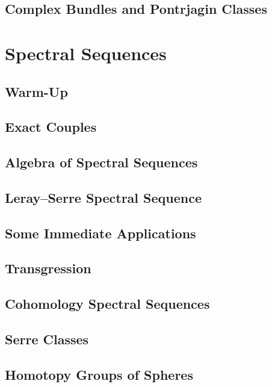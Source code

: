 \documentclass[11pt, a4paper]{article}
\begin{document}
\subsection{Complex Bundles and Pontrjagin Classes}

\section{Spectral Sequences}

\subsection{Warm-Up}

\subsection{Exact Couples}

\subsection{Algebra of Spectral Sequences}

\subsection{Leray--Serre Spectral Sequence}

\subsection{Some Immediate Applications}

\subsection{Transgression}

\subsection{Cohomology Spectral Sequences}

\subsection{Serre Classes}

\subsection{Homotopy Groups of Spheres}

\end{document}
